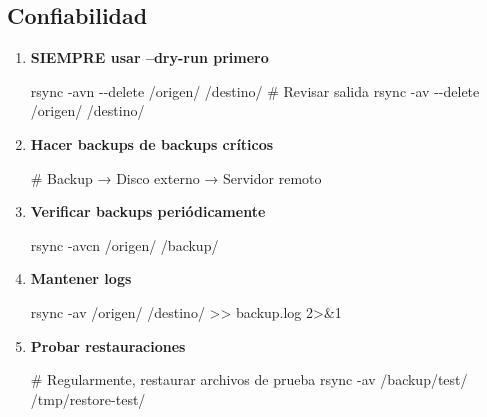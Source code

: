 \documentclass[
  doc,
  floatsintext,
  longtable,
  a4paper,
  nolmodern,
  notxfonts,
  notimes,
  12pt,
  colorlinks=true,linkcolor=blue,citecolor=blue,urlcolor=blue]{apa7}
\newenvironment{Shaded}{\begin{snugshade}}{\end{snugshade}}
\newcommand{\AttributeTok}[1]{\textcolor[rgb]{0.40,0.45,0.13}{#1}}
\newcommand{\CommentTok}[1]{\textcolor[rgb]{0.37,0.37,0.37}{#1}}
\newcommand{\DecValTok}[1]{\textcolor[rgb]{0.68,0.00,0.00}{#1}}
\newcommand{\FunctionTok}[1]{\textcolor[rgb]{0.28,0.35,0.67}{#1}}
\newcommand{\NormalTok}[1]{\textcolor[rgb]{0.00,0.23,0.31}{#1}}
\newcommand{\OperatorTok}[1]{\textcolor[rgb]{0.37,0.37,0.37}{#1}}
\begin{document}
\subsection{Confiabilidad}\label{confiabilidad}

\begin{enumerate}
\def\labelenumi{\arabic{enumi}.}
\item
  \textbf{SIEMPRE usar --dry-run primero}

\begin{Shaded}
\begin{Highlighting}[]
\FunctionTok{rsync} \AttributeTok{{-}avn} \AttributeTok{{-}{-}delete}\NormalTok{ /origen/ /destino/}
\CommentTok{\# Revisar salida}
\FunctionTok{rsync} \AttributeTok{{-}av} \AttributeTok{{-}{-}delete}\NormalTok{ /origen/ /destino/}
\end{Highlighting}
\end{Shaded}
\item
  \textbf{Hacer backups de backups críticos}

\begin{Shaded}
\begin{Highlighting}[]
\CommentTok{\# Backup → Disco externo → Servidor remoto}
\end{Highlighting}
\end{Shaded}
\item
  \textbf{Verificar backups periódicamente}

\begin{Shaded}
\begin{Highlighting}[]
\FunctionTok{rsync} \AttributeTok{{-}avcn}\NormalTok{ /origen/ /backup/}
\end{Highlighting}
\end{Shaded}
\item
  \textbf{Mantener logs}

\begin{Shaded}
\begin{Highlighting}[]
\FunctionTok{rsync} \AttributeTok{{-}av}\NormalTok{ /origen/ /destino/ }\OperatorTok{\textgreater{}\textgreater{}}\NormalTok{ backup.log }\DecValTok{2}\OperatorTok{\textgreater{}\&}\DecValTok{1}
\end{Highlighting}
\end{Shaded}
\item
  \textbf{Probar restauraciones}

\begin{Shaded}
\begin{Highlighting}[]
\CommentTok{\# Regularmente, restaurar archivos de prueba}
\FunctionTok{rsync} \AttributeTok{{-}av}\NormalTok{ /backup/test/ /tmp/restore{-}test/}
\end{Highlighting}
\end{Shaded}
\end{enumerate}
\end{document}
